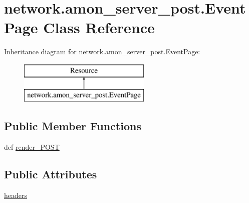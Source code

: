 \hypertarget{classnetwork_1_1amon__server__post_1_1_event_page}{\section{network.\-amon\-\_\-server\-\_\-post.\-Event\-Page Class Reference}
\label{classnetwork_1_1amon__server__post_1_1_event_page}
}
Inheritance diagram for network.\-amon\-\_\-server\-\_\-post.\-Event\-Page\-:\begin{figure}[H]
\begin{center}
\leavevmode
\includegraphics[height=2.000000cm]{classnetwork_1_1amon__server__post_1_1_event_page}
\end{center}
\end{figure}
\subsection*{Public Member Functions}
\begin{DoxyCompactItemize}
\item 
def \hyperlink{classnetwork_1_1amon__server__post_1_1_event_page_a739bce4a9714d953318887ba5c7b39d9}{render\-\_\-\-P\-O\-S\-T}
\end{DoxyCompactItemize}
\subsection*{Public Attributes}
\begin{DoxyCompactItemize}
\item 
\hyperlink{classnetwork_1_1amon__server__post_1_1_event_page_a032c0165742082f9d0e347cbdfb50711}{headers}
\end{DoxyCompactItemize}
